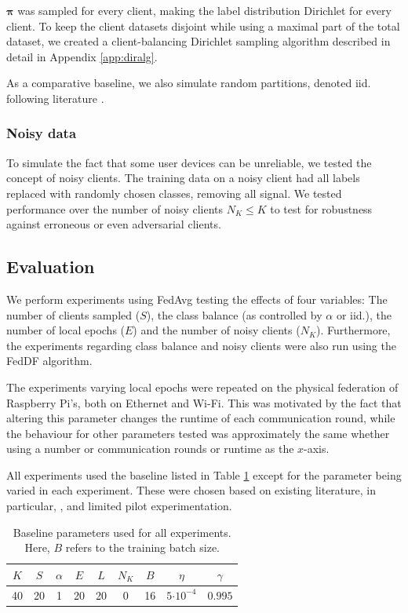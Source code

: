 \documentclass{article}
\newcommand{\ctp}[1]{\ensuremath{\cdot10^{#1}}}
\begin{document}
$\bm\pi$ was sampled for every client, making the label distribution Dirichlet for every client.
To keep the client datasets disjoint while using a maximal part of the total dataset, we created a client-balancing Dirichlet sampling algorithm described in detail in Appendix \ref{app:diralg}.

As a comparative baseline, we also simulate random partitions, denoted iid. following literature \cite{lin2020ensemble}.

\subsubsection{Noisy data}
To simulate the fact that some user devices can be unreliable, we tested the concept of noisy clients.
The training data on a noisy client had all labels replaced with randomly chosen classes, removing all signal.
We tested performance over the number of noisy clients $N_K\leq K$ to test for robustness against erroneous or even adversarial clients.

\subsection{Evaluation}
We perform experiments using FedAvg testing the effects of four variables: The number of clients sampled ($S$), the class balance (as controlled by $\alpha$ or iid.), the number of local epochs ($E$) and the number of noisy clients ($N_K$). 
Furthermore, the experiments regarding class balance and noisy clients were also run using the FedDF algorithm.

The experiments varying local epochs were repeated on the physical federation of Raspberry Pi's, both on Ethernet and Wi-Fi.
This was motivated by the fact that altering this parameter changes the runtime of each communication round, while the behaviour for other parameters tested was approximately the same whether using a number or communication rounds or runtime as the $x$-axis.

All experiments used the baseline listed in Table \ref{tab:baseline} except for the parameter being varied in each experiment.
These were chosen based on existing literature, in particular, \cite{mcmahan2017communication,lin2020ensemble}, and limited pilot experimentation.

\begin{table}[htb!]
    \centering
    \begin{tabular}{ccccccccc}
        $K$ & $S$ & $\alpha$ & $E$ & $L$ & $N_K$ & $B$ & $\eta$ & $\gamma$\\
        \hline
        40 & 20 & 1 & 20 & 20 & 0 & 16 & $5\ctp{-4}$ & $0.995$
    \end{tabular}
    \caption{Baseline parameters used for all experiments.
        Here, $B$ refers to the training batch size.}
    \label{tab:baseline}
\end{table}
\end{document}
